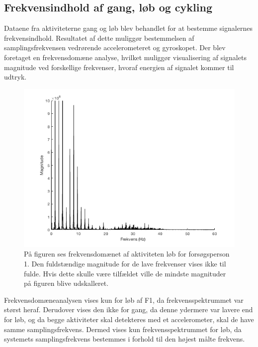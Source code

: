 \subsection{Frekvensindhold af gang, løb og cykling}
Dataene fra aktiviteterne gang og løb blev behandlet for at bestemme signalernes frekvensindhold. Resultatet af dette muliggør bestemmelsen af samplingsfrekvensen vedrørende accelerometeret og gyroskopet. Der blev foretaget en frekvensdomæne analyse, hvilket muliggør visualisering af signalets magnitude ved forskellige frekvenser, hvoraf energien af signalet kommer til udtryk.
\begin{figure}[H]
	\centering
	\includegraphics[scale=0.40]{figures/qBilag/fft_f1_loeb}
	\caption{På figuren ses frekvensdomænet af aktiviteten løb for forsøgsperson 1. Den fuldstændige magnitude for de lave frekvenser vises ikke til fulde. Hvis dette skulle være tilfældet ville de mindste magnituder på figuren blive udskalleret.}
	\label{fig:Ap_FFt}
\end{figure}\vspace{-.25cm}
Frekvensdomæneanalysen vises kun for løb af F1, da frekvensspektrummet var størst heraf. Derudover vises den ikke for gang, da denne ydermere var lavere end for løb, og da begge aktiviteter skal detekteres med et accelerometer, skal de have samme samplingsfrekvens. Dermed vises kun frekvensspektrummet for løb, da systemets samplingsfrekvens bestemmes i forhold til den højest målte frekvens.

